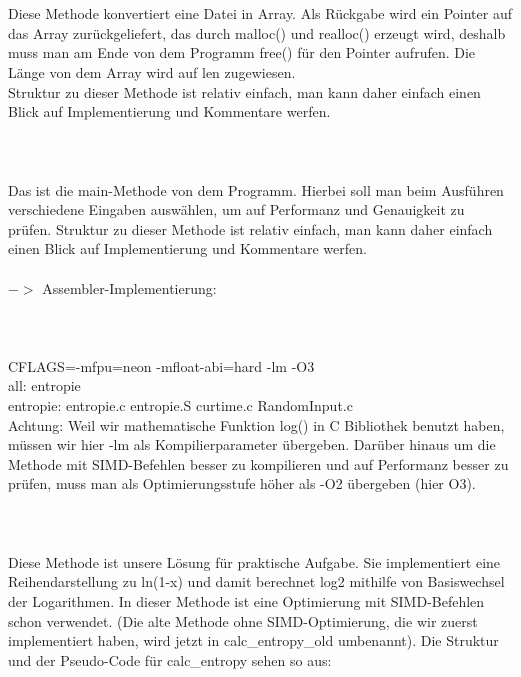 \documentclass[11pt]{article}
\begin{document}
{\color{red}{\Large float* fileToArray(int* len):}} \\\\
Diese Methode konvertiert eine Datei in Array. Als R\"uckgabe wird ein Pointer auf das Array zur\"uckgeliefert, das durch malloc() und realloc() erzeugt wird, deshalb muss man am Ende von dem Programm free() f\"ur den Pointer aufrufen. Die L\"ange von dem Array wird auf len zugewiesen.\\
Struktur zu dieser Methode ist relativ einfach, man kann daher einfach einen Blick auf Implementierung und Kommentare werfen.\\\\
{\color{red}{\Large void main():}}\\\\
Das ist die main-Methode von dem Programm. Hierbei soll man beim Ausf\"uhren verschiedene Eingaben ausw\"ahlen, um auf Performanz und Genauigkeit zu pr\"ufen. Struktur zu dieser Methode ist relativ einfach, man kann daher einfach einen Blick auf Implementierung und Kommentare werfen.\\\\
{\Large $->$ Assembler-Implementierung:}\\\\
{\color{red}{\Large Makefile:}}\\\\
CFLAGS=-mfpu=neon -mfloat-abi=hard -lm -O3 \\
all: entropie \\
entropie: entropie.c entropie.S curtime.c RandomInput.c\\
Achtung: Weil wir mathematische Funktion log() in C Bibliothek benutzt haben, m\"ussen wir hier -lm als Kompilierparameter \"ubergeben. Dar\"uber hinaus um die Methode mit SIMD-Befehlen besser zu kompilieren und auf Performanz besser zu pr\"ufen, muss man als Optimierungsstufe h\"oher als -O2 \"ubergeben (hier O3).\\\\
{\color{red}{\Large calc\_entropy(float* data, unsigned int len):}} \\\\
Diese Methode ist unsere L\"osung f\"ur praktische Aufgabe. Sie implementiert eine Reihendarstellung zu ln(1-x) und damit berechnet log2 mithilfe von Basiswechsel der Logarithmen. In dieser Methode ist eine Optimierung mit SIMD-Befehlen schon verwendet. (Die alte Methode ohne SIMD-Optimierung, die wir zuerst implementiert haben, wird jetzt in calc\_entropy\_old umbenannt).
Die Struktur und der Pseudo-Code f\"ur calc\_entropy sehen so aus:\\\\
\end{document}
